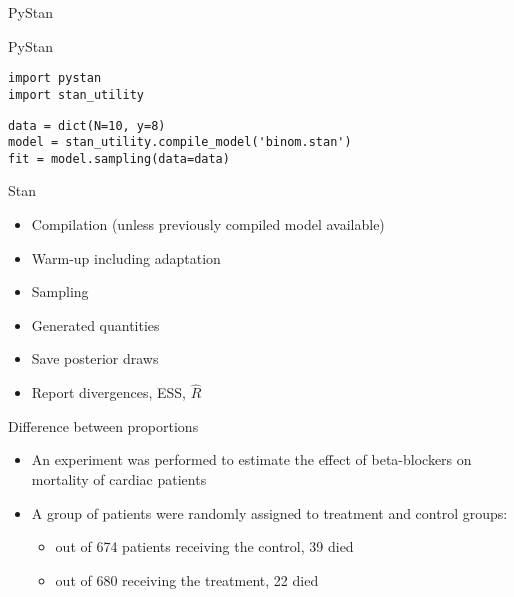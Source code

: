 \documentclass[finnish,english,t]{beamer}
\begin{document}
\begin{frame}[fragile]{PyStan}

  {\small
    {
      PyStan
\begin{verbatim}
import pystan
import stan_utility
\end{verbatim}
    }
    {
\begin{verbatim}
data = dict(N=10, y=8)
model = stan_utility.compile_model('binom.stan')
fit = model.sampling(data=data)
\end{verbatim}
    }
  }
\end{frame}

\begin{frame}{Stan}
  
  \begin{itemize}
  \item Compilation (unless previously compiled model available)
  \item Warm-up including adaptation
  \item Sampling
  \item Generated quantities
  \item Save posterior draws
  \item Report divergences, ESS, $\widehat{R}$
  \end{itemize}

\end{frame}

\begin{frame}{Difference between proportions}
  
\begin{itemize}
  \item An experiment was performed to estimate the effect of
    beta-blockers on mortality of cardiac patients
  \item A group of
    patients were randomly assigned to treatment and control groups:
    \begin{itemize}
    \item out of 674 patients receiving the control, 39 died
    \item out of 680 receiving the treatment, 22 died
    \end{itemize}
  \end{itemize}
\end{frame}
\end{document}
